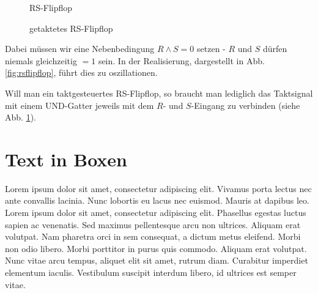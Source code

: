 \documentclass[12pt, a4paper, twopage]{scrartcl}
\begin{document}
\begin{figure}[h!]
\centering
  \centering
    \caption{RS-Flipflop}%
    \label{fig:rsflipflop}
  \endminipage\hspace{1cm}   
%
	\centering
    \caption{getaktetes RS-Flipflop}%
    \label{fig:rsflipfloptakt}
  \endminipage
\end{figure}

Dabei müssen wir eine Nebenbedingung $R \wedge S = 0$ setzen - $R$ und $S$ dürfen niemals gleichzeitig $= 1$ sein. In der Realisierung, dargestellt in Abb. \ref{fig:rsflipflop}, führt dies zu oszillationen. 

Will man ein taktgesteuertes RS-Flipflop, so braucht man lediglich das Taktsignal mit einem UND-Gatter jeweils mit dem $R$- und $S$-Eingang zu verbinden (siehe Abb. \ref{fig:rsflipfloptakt}).
















\section{Text in Boxen}

\begin{mdframed}[style=exampledefault,frametitle={Braucht package mdframed.}]
Lorem ipsum dolor sit amet, consectetur adipiscing elit. Vivamus porta lectus nec ante convallis lacinia. Nunc lobortis eu lacus nec euismod. Mauris at dapibus leo. Lorem ipsum dolor sit amet, consectetur adipiscing elit. Phasellus egestas luctus sapien ac venenatis. Sed maximus pellentesque arcu non ultrices. Aliquam erat volutpat. Nam pharetra orci in sem consequat, a dictum metus eleifend. Morbi non odio libero. Morbi porttitor in purus quis commodo. Aliquam erat volutpat. Nunc vitae arcu tempus, aliquet elit sit amet, rutrum diam. Curabitur imperdiet elementum iaculis. Vestibulum suscipit interdum libero, id ultrices est semper vitae.
\end{mdframed}
\end{document}
